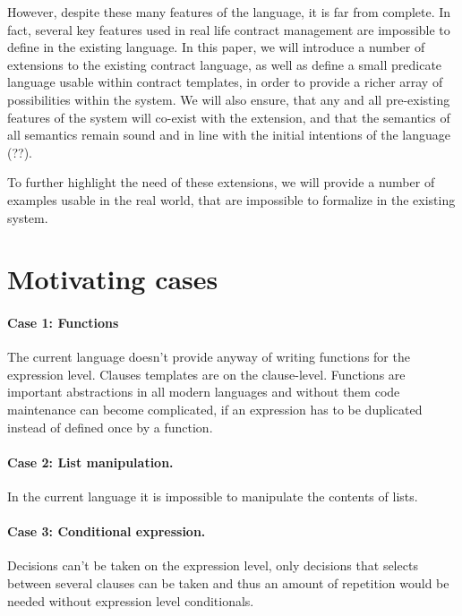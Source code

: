 \documentclass[10pt,a4paper,final,oneside,openany,article]{memoir}
\begin{document}
However, despite these many features of the language, it is far from complete.
In fact, several key features used in real life contract management are
impossible to define in the existing language. In this paper, we will introduce
a number of extensions to the existing contract language, as well as define a
small predicate language usable within contract templates, in order to provide a
richer array of possibilities within the system. We will also ensure, that any
and all pre-existing features of the system will co-exist with the extension,
and that the semantics of all semantics remain sound and in line with the
initial intentions of the language (??).

To further highlight the need of these extensions, we will provide a number of
examples usable in the real world, that are impossible to formalize in the
existing system.


\section{Motivating cases}
\label{motivation}

\paragraph{Case 1: Functions} The current language doesn't provide
anyway of writing functions for the expression level. Clauses
templates are on the clause-level. Functions are important
abstractions in all modern languages and without them code maintenance
can become complicated, if an expression has to be duplicated instead
of defined once by a function.

\paragraph{Case 2: List manipulation.} In the current language it is
impossible to manipulate the contents of lists.

\paragraph{Case 3: Conditional expression.} Decisions can't be taken
on the expression level, only decisions that selects between several
clauses can be taken and thus an amount of repetition would be needed
without expression level conditionals.
\end{document}
